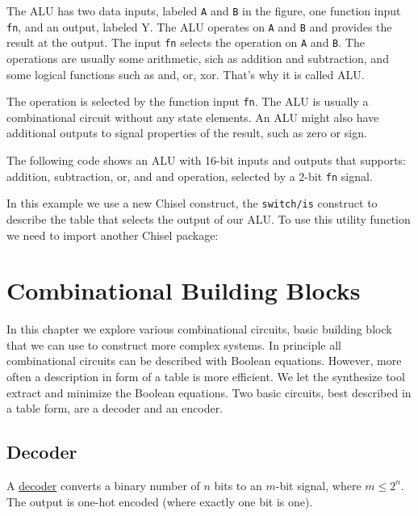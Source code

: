 \documentclass[%
    10pt, %
    headinclude, footexclude,
    openright, %
    notitlepage,
    cleardoubleempty,
    headsepline,
    pointlessnumbers,
    bibtotoc, idxtotoc,
    ]{scrbook}
\newcommand{\code}[1]{{\small{\texttt{#1}}}}
\newcommand{\myref}[2]{\href{#1}{#2}}
\begin{document}
The ALU has two data inputs, labeled \code{A} and \code{B} in the figure, one function input \code{fn},
and an output, labeled {Y}. The ALU operates on \code{A} and \code{B} and provides the result
at the output. The input \code{fn} selects the operation on \code{A} and \code{B}.
The operations are usually some arithmetic, sich as addition and subtraction, and some logical
functions such as and, or, xor. That's why it is called ALU.

The operation is selected by the function input \code{fn}. The ALU is usually a combinational
circuit without any state elements. An ALU might also have additional outputs to signal properties
of the result, such as zero or sign.

The following code shows an ALU with 16-bit inputs and outputs that supports: addition, subtraction, or, and and
operation, selected by a 2-bit \code{fn} signal.



\noindent In this example we use a new Chisel construct, the \code{switch/is} construct to describe
the table that selects the output of our ALU.
To use this utility function we need to import another Chisel package:



\chapter{Combinational Building Blocks}

In this chapter we explore various combinational circuits, basic building block that we can
use to construct more complex systems.
In principle all combinational circuits can be described with Boolean equations.
However, more often a description in form of a table is more efficient.
We let the synthesize tool extract and minimize the Boolean equations.
Two basic circuits, best described in a table form, are a decoder and an encoder.

\section{Decoder}

A \myref{https://en.wikipedia.org/wiki/Binary_decoder}{decoder}
converts a binary number of $n$ bits to an $m$-bit signal, where $m \leq 2^n$.
The output is one-hot encoded (where exactly one bit is one).
\end{document}
